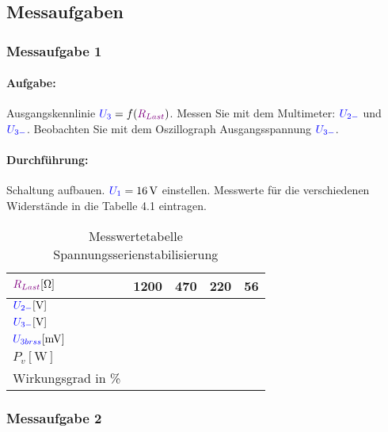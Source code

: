 \documentclass[11pt,a4paper,titlepage]{scrreprt}
\begin{document}
            \subsection{Messaufgaben}
            \subsubsection{Messaufgabe 1}
            \paragraph{Aufgabe:}  Ausgangskennlinie $\textcolor{blue}{U_3} = f(\textcolor{violet}{R_{Last}})$. Messen Sie mit dem Multimeter: $\textcolor{blue}{U_{2-}}$ und $\textcolor{blue}{U_{3-}}$. Beobachten Sie mit dem Oszillograph Ausgangsspannung $\textcolor{blue}{U_{3-}}$.
            
            \paragraph{Durchführung:} Schaltung aufbauen. $\textcolor{blue}{U_1} = \SI{16}{\volt}$ einstellen. Messwerte für die verschiedenen Widerstände in die Tabelle 4.1 eintragen.
            
            \begin{table}[!hbtp]
                \caption{Messwertetabelle Spannungsserienstabilisierung}
                \label{tbl:messergebnisse4.1}
                \renewcommand{\arraystretch}{1.3}
                \begin{center}
                    \begin{tabular}{l|cccc}
                        $\textcolor{violet}{R_{Last}} [\si{\ohm}]$ & 1200 & 470 & 220 & 56 \\ \hline
                        $\textcolor{blue}{U_{2-}} [\si{\volt}]$  &  &  &  &\\
                        $\textcolor{blue}{U_{3-}} [\si{\volt}]$ &  &  &  & \\
                        $\textcolor{blue}{U_{3brss}} [\si{\milli\volt}]$ &  &  &  &  \\
                        $P_v [\si{\watt}]$ &   &   &   &  \\
                        Wirkungsgrad in \% &  &  &   &  \\
                    \end{tabular}
                \end{center}
            \end{table}
            
            \subsubsection{Messaufgabe 2}
\end{document}
